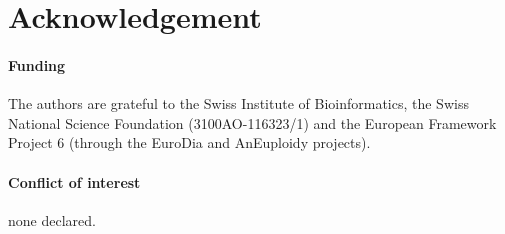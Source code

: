 \documentclass[round]{bioinfo}
\begin{document}
\section*{Acknowledgement}

\paragraph{Funding\textcolon} The authors are grateful to the Swiss
Institute of Bioinformatics, the Swiss National Science Foundation
(3100AO-116323/1) and the European Framework Project 6 (through
the EuroDia and AnEuploidy projects).

\paragraph{Conflict of interest\textcolon} none declared.
\end{document}

